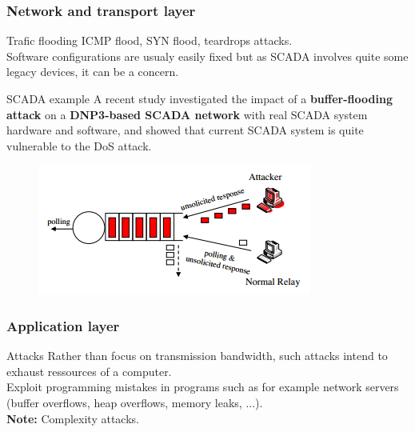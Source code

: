 \documentclass{beamer}
\begin{document}
\begin{frame}
    \frametitle{Network and transport layer}

    \begin{block}{Trafic flooding}
        ICMP flood, SYN flood, teardrops attacks.\\
        \medskip
        Software configurations are usualy easily fixed but as SCADA involves quite some legacy devices, it can be a concern.
    \end{block}
    \vfill
    \begin{block}{SCADA example}
        A recent study investigated the impact of a {\bf buffer-flooding attack} on a {\bf DNP3-based SCADA network} with real SCADA system hardware and software, and showed that current SCADA system is quite vulnerable to the DoS attack.

        \begin{figure}[htb]
            \centering
            \includegraphics[scale=.35]{dnp3}
        \end{figure}
    \end{block}
\end{frame}

\begin{frame}
    \frametitle{Application layer}

    \begin{block}{Attacks}
        Rather than focus on transmission bandwidth, such attacks intend to exhaust ressources of a computer.\\
        \medskip
        Exploit programming mistakes in programs such as for example network servers (buffer overflows, heap overflows, memory leaks, ...).\\
        \medskip
        {\bf Note:} Complexity attacks.
    \end{block}
\end{frame}
\end{document}
